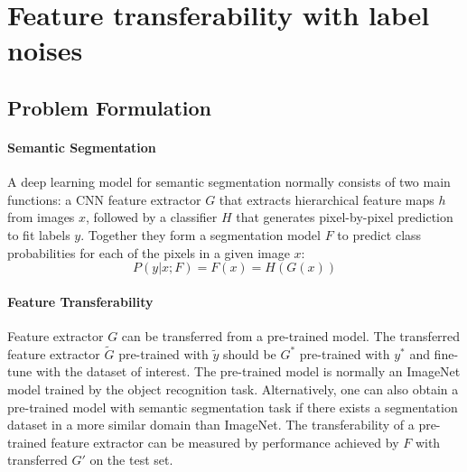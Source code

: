 \section{Feature transferability with label noises}
\label{sec:robustness}


\subsection{Problem Formulation}
\label{subsec:formulation}

\paragraph{Semantic Segmentation}

A deep learning model for semantic segmentation normally consists of two main functions: a CNN feature extractor $G$ that extracts hierarchical feature maps $h$ from images $x$, followed by a classifier $H$ that generates pixel-by-pixel prediction to fit labels $y$.
Together they form a segmentation model $F$ to predict class probabilities for each of the pixels in a given image $x$:
$$P(y \vert x; F) = F(x) = H(G(x))$$

\paragraph{Feature Transferability}
Feature extractor $G$ can be transferred from a pre-trained model.
The transferred feature extractor $\tilde{G}$ pre-trained with $\tilde{y}$ should be $G^{\ast}$ pre-trained with $y^{\ast}$ and fine-tune with the dataset of interest.
The pre-trained model is normally an ImageNet model trained by the object recognition task.
Alternatively, one can also obtain a pre-trained model with semantic segmentation task if there exists a segmentation dataset in a more similar domain than ImageNet.
The transferability of a pre-trained feature extractor can be measured by performance achieved by $F$ with transferred $G'$ on the test set.

